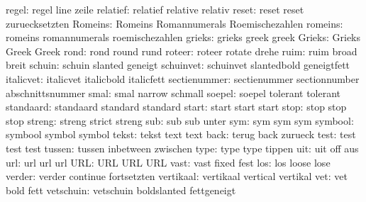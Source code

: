              regel:  regel                line                zeile
           relatief:  relatief             relative            relativ
              reset:  reset                reset               zuruecksetzten
            Romeins:  Romeins              Romannumerals       Roemischezahlen
            romeins:  romeins              romannumerals       roemischezahlen
             grieks:  grieks               greek               greek 
             Grieks:  Grieks               Greek               Greek 
               rond:  rond                 round               rund
             roteer:  roteer               rotate              drehe
               ruim:  ruim                 broad               breit
             schuin:  schuin               slanted             geneigt
          schuinvet:  schuinvet            slantedbold         geneigtfett
          italicvet:  italicvet            italicbold          italicfett
       sectienummer:  sectienummer         sectionnumber       abschnittsnummer
               smal:  smal                 narrow              schmall
             soepel:  soepel               tolerant            tolerant
          standaard:  standaard            standard            standard
              start:  start                start               start
               stop:  stop                 stop                stop
             streng:  streng               strict              streng
                sub:  sub                  sub                 unter
                sym:  sym                  sym                 sym
            symbool:  symbool              symbol              symbol
              tekst:  tekst                text                text
               back:  terug                back                zurueck
               test:  test                 test                test
             tussen:  tussen               inbetween           zwischen
               type:  type                 type                tippen
                uit:  uit                  off                 aus
                url:  url                  url                 url
                URL:  URL                  URL                 URL
               vast:  vast                 fixed               fest
                los:  los                  loose               lose 
             verder:  verder               continue            fortsetzten
          vertikaal:  vertikaal            vertical            vertikal
                vet:  vet                  bold                fett
          vetschuin:  vetschuin            boldslanted         fettgeneigt

